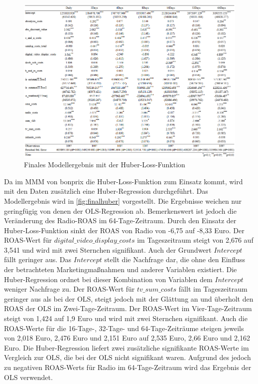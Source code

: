 \begin{figure}[H]
    \centering
    \includegraphics[width=1\linewidth]{images/finalhuber.png}
    \caption{Finales Modellergebnis mit der Huber-Loss-Funktion}
    \label{fig:finalhuber}
\end{figure}
Da im \ac{MMM} von bonprix die Huber-Loss-Funktion zum Einsatz kommt, wird mit den Daten zusätzlich eine Huber-Regression durchgeführt. Das Modellergebnis wird in \autoref{fig:finalhuber} vorgestellt. Die Ergebnisse weichen nur geringfügig von denen der \ac{OLS}-Regression ab. Bemerkenswert ist jedoch die Veränderung des Radio-\ac{ROAS} im 64-Tage-Zeitraum. Durch den Einsatz der Huber-Loss-Funktion sinkt der \ac{ROAS} von Radio von -6,75 auf -8,33 Euro. Der \ac{ROAS}-Wert für \(digital\_video\_display\_costs\) im Tageszeitraum steigt von 2,676 auf 3,541 und wird mit zwei Sternchen signifikant. Auch der Grundwert \(Intercept\) fällt geringer aus. Das \(Intercept\) stellt die Nachfrage dar, die ohne den Einfluss der betrachteten Marketingmaßnahmen und anderer Variablen existiert. Die Huber-Regression ordnet bei dieser Kombination von Variablen dem \(Intercept\) weniger Nachfrage zu. Der \ac{ROAS}-Wert für \(tv\_sum\_costs\) fällt im Tageszeitraum geringer aus als bei der \ac{OLS}, steigt jedoch mit der Glättung an und überholt den \ac{ROAS} der \ac{OLS} im Zwei-Tage-Zeitraum. Der \ac{ROAS}-Wert im Vier-Tage-Zeitraum steigt von 1,424 auf 1,9 Euro und wird mit zwei Sternchen signifikant. Auch die \ac{ROAS}-Werte für die 16-Tage-, 32-Tage- und 64-Tage-Zeiträume steigen jeweils von 2,018 Euro, 2,476 Euro und 2,151 Euro auf 2,535 Euro, 2,66 Euro und 2,162 Euro. Die Huber-Regression liefert zwei zusätzliche signifikante \ac{ROAS}-Werte im Vergleich zur \ac{OLS}, die bei der \ac{OLS} nicht signifikant waren. Aufgrund des jedoch zu negativen \ac{ROAS}-Werts für Radio im 64-Tage-Zeitraum wird das Ergebnis der \ac{OLS} verwendet.
